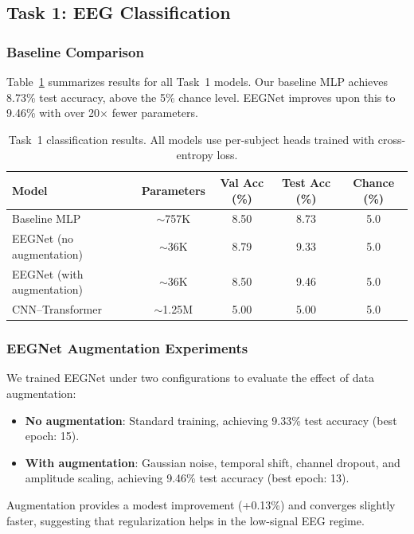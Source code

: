 \documentclass{article}
\begin{document}
\subsection{Task 1: EEG Classification}

\subsubsection{Baseline Comparison}

Table~\ref{tab:task1_results} summarizes results for all Task~1 models. Our baseline MLP achieves 8.73\% test accuracy, above the 5\% chance level. EEGNet improves upon this to 9.46\% with over 20$\times$ fewer parameters.

\begin{table}[h]
  \caption{Task~1 classification results. All models use per-subject heads trained with cross-entropy loss.}
  \label{tab:task1_results}
  \centering
  \small
  \begin{tabular}{lcccc}
    \toprule
    Model & Parameters & Val Acc (\%) & Test Acc (\%) & Chance (\%) \\
    \midrule
    Baseline MLP              & $\sim$757K  & 8.50 & 8.73 & 5.0 \\
    EEGNet (no augmentation)  & $\sim$36K   & 8.79 & 9.33 & 5.0 \\
    EEGNet (with augmentation)& $\sim$36K   & 8.50 & 9.46 & 5.0 \\
    CNN--Transformer          & $\sim$1.25M & 5.00 & 5.00 & 5.0 \\
    \bottomrule
  \end{tabular}
\end{table}

\subsubsection{EEGNet Augmentation Experiments}

We trained EEGNet under two configurations to evaluate the effect of data augmentation:
\begin{itemize}
    \item \textbf{No augmentation}: Standard training, achieving 9.33\% test accuracy (best epoch: 15).
    \item \textbf{With augmentation}: Gaussian noise, temporal shift, channel dropout, and amplitude scaling, achieving 9.46\% test accuracy (best epoch: 13).
\end{itemize}
Augmentation provides a modest improvement (+0.13\%) and converges slightly faster, suggesting that regularization helps in the low-signal EEG regime.
\end{document}

